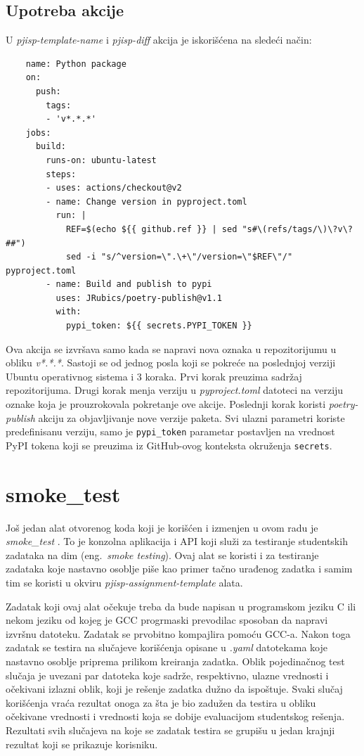 \documentclass[12pt]{report}
\begin{document}
\subsection{Upotreba akcije}
U \textit{pjisp-template-name} i \textit{pjisp-diff} akcija je iskorišćena na sledeći način:
\begin{samepage}
    \begin{verbatim}
    name: Python package
    on:
      push:
        tags:
        - 'v*.*.*'
    jobs:
      build:
        runs-on: ubuntu-latest
        steps:
        - uses: actions/checkout@v2
        - name: Change version in pyproject.toml
          run: |
            REF=$(echo ${{ github.ref }} | sed "s#\(refs/tags/\)\?v\?##")
            sed -i "s/^version=\".\+\"/version=\"$REF\"/" pyproject.toml
        - name: Build and publish to pypi
          uses: JRubics/poetry-publish@v1.1
          with:
            pypi_token: ${{ secrets.PYPI_TOKEN }}
    \end{verbatim}
\end{samepage}

Ova akcija se izvršava samo kada se napravi nova oznaka u repozitorijumu u obliku \textit{v*.*.*}. Sastoji se od jednog posla koji se pokreće na poslednjoj verziji Ubuntu operativnog sistema i 3 koraka. Prvi korak preuzima sadržaj repozitorijuma. Drugi korak menja verziju u \textit{pyproject.toml} datoteci na verziju oznake koja je prouzrokovala pokretanje ove akcije. Poslednji korak koristi \textit{poetry-publish} akciju za objavljivanje nove verzije paketa. Svi ulazni parametri koriste predefinisanu verziju, samo je \texttt{pypi\_token} parametar postavljen na vrednost PyPI tokena koji se preuzima iz GitHub-ovog konteksta okruženja \texttt{secrets}.

\section{smoke\_test}
Još jedan alat otvorenog koda koji je korišćen i izmenjen u ovom radu je \textit{smoke\_test} \cite{smoke-test}. To je konzolna aplikacija i API koji služi za testiranje studentskih zadataka na dim (eng.\ \textit{smoke testing}). Ovaj alat se koristi i za testiranje zadataka koje nastavno osoblje piše kao primer tačno urađenog zadatka i samim tim se koristi u okviru \textit{pjisp-assignment-template} alata.

Zadatak koji ovaj alat očekuje treba da bude napisan u programskom jeziku C ili nekom jeziku od kojeg je GCC progrmaski prevodilac sposoban da napravi izvršnu datoteku. Zadatak se prvobitno kompajlira pomoću GCC-a. Nakon toga zadatak se testira na slučajeve korišćenja opisane u \textit{.yaml} datotekama koje nastavno osoblje priprema prilikom kreiranja zadatka. Oblik pojedinačnog test slučaja je uvezani par datoteka koje sadrže, respektivno, ulazne vrednosti i očekivani izlazni oblik, koji je rešenje zadatka dužno da ispoštuje. Svaki slučaj korišćenja vraća rezultat onoga za šta je bio zadužen da testira u obliku očekivane vrednosti i vrednosti koja se dobije evaluacijom studentskog rešenja. Rezultati svih slučajeva na koje se zadatak testira se grupišu u jedan krajnji rezultat koji se prikazuje korisniku.
\end{document}
